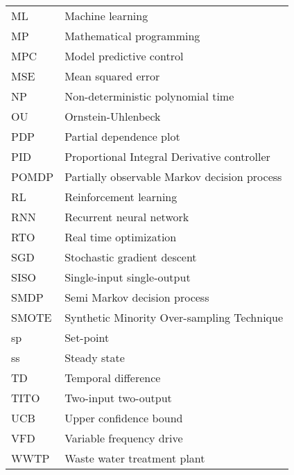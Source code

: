 \documentclass[12pt]{report}
\begin{document}
\newpage
\begin{tabular}{@{}ll}
ML & Machine learning \\
MP & Mathematical programming \\
MPC & Model predictive control \\
MSE & Mean squared error \\
NP & Non-deterministic polynomial time \\
OU & Ornstein-Uhlenbeck \\
PDP & Partial dependence plot \\
PID & Proportional Integral Derivative controller \\
POMDP & Partially observable Markov decision process \\
RL & Reinforcement learning \\
RNN & Recurrent neural network \\
RTO & Real time optimization \\
SGD & Stochastic gradient descent \\
SISO & Single-input single-output \\
SMDP & Semi Markov decision process \\
SMOTE & Synthetic Minority Over-sampling Technique \\
sp & Set-point \\
ss & Steady state \\
TD & Temporal difference \\
TITO & Two-input two-output \\
UCB & Upper confidence bound \\
VFD & Variable frequency drive \\
WWTP & Waste water treatment plant \\
\end{tabular}

% 

% 

% 
\end{document}
